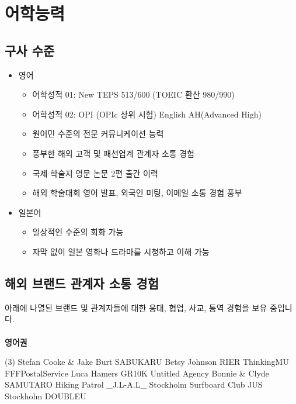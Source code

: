 \documentclass[a4paper,10pt]{extarticle}
\begin{document}
\section*{어학능력}
\subsection*{구사 수준}
\begin{itemize}
	\item 영어
	      \begin{itemize}
		      \item 어학성적 01: New TEPS 513/600 (TOEIC 환산 980/990)
		      \item 어학성적 02: OPI (OPIc 상위 시험) English AH(Advanced High)
		      \item 원어민 수준의 전문 커뮤니케이션 능력
		      \item 풍부한 해외 고객 및 패션업계 관계자 소통 경험
		      \item 국제 학술지 영문 논문 2편 출간 이력
		      \item 해외 학술대회 영어 발표, 외국인 미팅, 이메일 소통 경험 풍부
	      \end{itemize}
	\item 일본어
	      \begin{itemize}
		      \item 일상적인 수준의 회화 가능
		      \item 자막 없이 일본 영화나 드라마를 시청하고 이해 가능
	      \end{itemize}
\end{itemize}

\subsection*{해외 브랜드 관계자 소통 경험}
아래에 나열된 브랜드 및 관계자들에 대한 응대, 협업, 사교, 통역 경험을 보유 중입니다.\\\\
\noindent
{\textbf{영어권}}
\begin{tasks}[style=itemize](3)
	\task Stefan Cooke \& Jake Burt
	\task SABUKARU
	\task Betsy Johnson
	\task RIER
	\task ThinkingMU
	\task FFFPostalService
	\task Luca Hamers
	\task GR10K
	\task Untitled Agency
	\task Bonnie \& Clyde
	\task SAMUTARO
	\task Hiking Patrol
	\task \_J.L-A.L\_
	\task Stockholm Surfboard Club
	\task JUS Stockholm
	\task DOUBLEU
\end{tasks}
\end{document}
